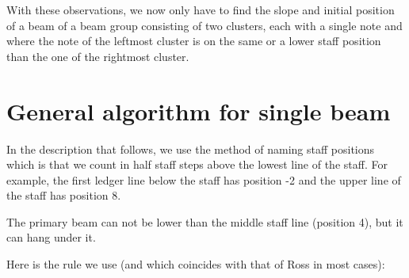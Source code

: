 With these observations, we now only have to find the slope and
initial position of a beam of a beam group consisting of two clusters,
each with a single note and where the note of the leftmost cluster is
on the same or a lower staff position than the one of the rightmost
cluster.  

\section{General algorithm for single beam}

In the description that follows, we use the \sysname{} method of naming
staff positions which is that we count in half staff steps above the lowest
line of the staff.  For example, the first ledger line below the staff has
position -2 and the upper line of the staff has position 8. 

The primary beam can not be lower than the middle staff line (position
4), but it can hang under it. 

Here is the rule we use (and which coincides with that of Ross in most
cases):

